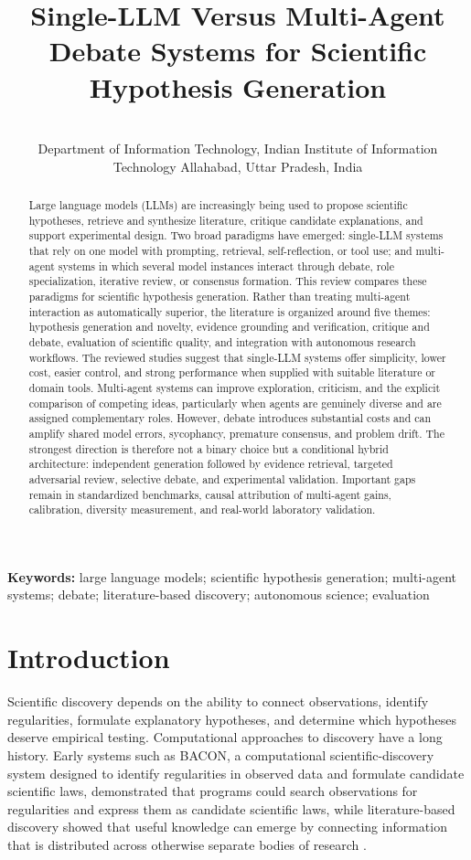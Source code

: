 \documentclass[11pt]{article}
\title{Single-LLM Versus Multi-Agent Debate Systems for Scientific Hypothesis Generation}
\author{
  \parbox{0.9\textwidth}{\centering
    \mbox{}\\
    Department of Information Technology, Indian Institute of Information Technology Allahabad, Uttar Pradesh, India
  }
}
\date{}
\begin{document}
\maketitle

\begin{abstract}
Large language models (LLMs) are increasingly being used to propose scientific hypotheses,
retrieve and synthesize literature, critique candidate explanations, and support experimental design.
Two broad paradigms have emerged: single-LLM systems that rely on one model with prompting,
retrieval, self-reflection, or tool use; and multi-agent systems in which several model instances
interact through debate, role specialization, iterative review, or consensus formation. This review
compares these paradigms for scientific hypothesis generation. Rather than treating multi-agent
interaction as automatically superior, the literature is organized around five themes: hypothesis
generation and novelty, evidence grounding and verification, critique and debate, evaluation of
scientific quality, and integration with autonomous research workflows. The reviewed studies
suggest that single-LLM systems offer simplicity, lower cost, easier control, and strong
performance when supplied with suitable literature or domain tools. Multi-agent systems can
improve exploration, criticism, and the explicit comparison of competing ideas, particularly when
agents are genuinely diverse and are assigned complementary roles. However, debate introduces
substantial costs and can amplify shared model errors, sycophancy, premature consensus, and
problem drift. The strongest direction is therefore not a binary choice but a conditional hybrid
architecture: independent generation followed by evidence retrieval, targeted adversarial review,
selective debate, and experimental validation. Important gaps remain in standardized benchmarks,
causal attribution of multi-agent gains, calibration, diversity measurement, and real-world
laboratory validation.
\end{abstract}

\noindent\textbf{Keywords:} large language models; scientific hypothesis generation; multi-agent systems; debate;
literature-based discovery; autonomous science; evaluation

\section{Introduction}
\label{sec:introduction}

Scientific discovery depends on the ability to connect observations, identify regularities, formulate explanatory hypotheses, and determine which hypotheses deserve empirical testing. Computational approaches to discovery have a long history. Early systems such as BACON, a computational scientific-discovery system designed to identify regularities in observed data and formulate candidate scientific laws, demonstrated that programs could search observations for regularities and express them as candidate scientific laws, while literature-based discovery showed that useful knowledge can emerge by connecting information that is distributed across otherwise separate bodies of research \cite{swanson1986undiscovered,langley1987scientific}.
\end{document}
